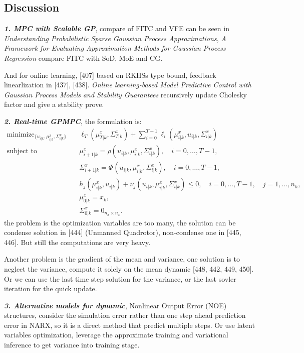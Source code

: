 \documentclass[10pt]{elegantbook}
\newcommand{\mydefination}[1]{\textbf{\textit{\textcolor{structurecolor}{#1}}}}
\begin{document}
\subsection{Discussion}
\mydefination{1. MPC with Scalable GP}, compare of FITC and VFE can be seen in \textit{Understanding Probabilistic Sparse Gaussian Process Approximations},
\textit{A Framework for Evaluating Approximation Methods for Gaussian Process Regression} compare FITC with SoD, MoE and CG. 

And for online learning, [407]
based on RKHSs type bound, feedback linearlization in [437], [438]. \textit{Online learning-based Model Predictive Control with Gaussian Process Models and Stability Guarantees}
recursively update Cholesky factor and give a stability prove.

\mydefination{2. Real-time GPMPC}, the formulation is:
\begin{equation}
    \begin{array}{rl}
        \text{minimize}_{\{u_{i|k},\mu_{i|k}^{x},\Sigma_{i|k}^{x}\}} \quad & \ell_T(\mu_{T|k}^x, \Sigma_{T|k}^x) + \sum_{i=0}^{T-1} \ell_i(\mu_{i|k}^x, u_{i|k}, \Sigma_{i|k}^x) \\
        \text{subject to} \quad & \mu_{i+1|k}^x = \rho(u_{i|k}, \mu_{i|k}^x, \Sigma_{i|k}^x), \quad i = 0, \ldots, T-1, \\
        \quad & \Sigma_{i+1|k}^x = \Phi(u_{i|k}, \mu_{i|k}^x, \Sigma_{i|k}^x), \quad i = 0, \ldots, T-1, \\
        \quad & h_j(\mu_{i|k}^x, u_{i|k}) + \nu_j(u_{i|k}, \mu_{i|k}^x, \Sigma_{i|k}^x) \leq 0, \quad i = 0, \ldots, T-1, \quad j = 1, \ldots, n_h, \\
        \quad & \mu_{0|k}^x = x_k, \\
        \quad & \Sigma_{0|k}^x = 0_{n_x \times n_x}.
    \end{array}
\end{equation}
the problem is the optimization variables are too many, the solution can be
condense solution in [444] (Unmanned Quadrotor), non-condense one in [445, 446]. But still the computations are very heavy.

Another problem is the gradient of the mean and variance, one solution is to neglect the variance, compute it solely on the mean dynamic [448, 442, 449, 450].
Or we can use the last time step solution for the variance, or the last sovler iteration for the quick update.

\mydefination{3. Alternative models for dynamic}, Nonlinear Output Error (NOE) structures, consider the simulation error rather than one step ahead prediction 
error in NARX, so it is a direct method that predict multiple steps. Or use latent variables optimization, leverage the approximate training and variational
inference to get variance into training stage.
\end{document}
